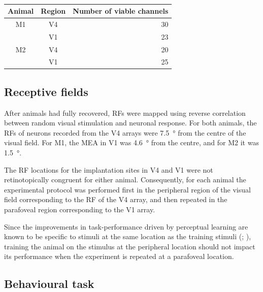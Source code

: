 \begin{table}[bthp]
\begin{center}
\begin{tabular}{ccr}
\toprule
Animal   & Region   & Number of viable channels \\
\midrule
\acs{M1} & \acs{V4} & 30 \\
         & \acs{V1} & 23 \\
\acs{M2} & \acs{V4} & 20 \\
         & \acs{V1} & 25 \\
\bottomrule
\end{tabular}
\end{center}
\caption{
}
\label{tab:nchannels}
\end{table}


\subsection{Receptive fields}

After animals had fully recovered, \acp{RF} were mapped using reverse correlation between random visual stimulation and neuronal response.
For both animals, the \acp{RF} of neurons recorded from the \ac{V4} arrays were \SI{7.5}{\degree} from the centre of the visual field.
For \ac{M1}, the \ac{MEA} in \ac{V1} was \SI{4.6}{\degree} from the centre, and for \ac{M2} it was \SI{1.5}{\degree}.

The \ac{RF} locations for the implantation sites in \ac{V4} and \ac{V1} were not retinotopically congruent for either animal.
Consequently, for each animal the experimental protocol was performed first in the peripheral region of the visual field corresponding to the \ac{RF} of the \ac{V4} array, and then repeated in the parafoveal region corresponding to the \ac{V1} array.

Since the improvements in task-performance driven by perceptual learning are known to be specific to stimuli at the same location as the training stimuli (\citealp{Fiorentini1980}; \citealp{Fiorentini1981,Poggio1991,Karni1991}), training the animal on the stimulus at the peripheral location should not impact its performance when the experiment is repeated at a parafoveal location.


\subsection{Behavioural task}
\label{sec:pl_task}

